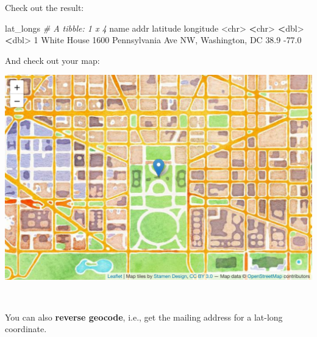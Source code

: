 \documentclass[
]{book}
\newenvironment{Shaded}{\begin{snugshade}}{\end{snugshade}}
\newcommand{\AttributeTok}[1]{\textcolor[rgb]{0.77,0.63,0.00}{#1}}
\newcommand{\CommentTok}[1]{\textcolor[rgb]{0.56,0.35,0.01}{\textit{#1}}}
\newcommand{\DecValTok}[1]{\textcolor[rgb]{0.00,0.00,0.81}{#1}}
\newcommand{\ErrorTok}[1]{\textcolor[rgb]{0.64,0.00,0.00}{\textbf{#1}}}
\newcommand{\FloatTok}[1]{\textcolor[rgb]{0.00,0.00,0.81}{#1}}
\newcommand{\FunctionTok}[1]{\textcolor[rgb]{0.00,0.00,0.00}{#1}}
\newcommand{\NormalTok}[1]{#1}
\newcommand{\SpecialCharTok}[1]{\textcolor[rgb]{0.00,0.00,0.00}{#1}}
\begin{document}
Check out the result:

\begin{Shaded}
\begin{Highlighting}[]
\NormalTok{lat\_longs}
\CommentTok{\# A tibble: 1 x 4}
\NormalTok{  name        addr                                     latitude longitude}
  \SpecialCharTok{\textless{}}\NormalTok{chr}\SpecialCharTok{\textgreater{}}       \ErrorTok{\textless{}}\NormalTok{chr}\SpecialCharTok{\textgreater{}}                                       \ErrorTok{\textless{}}\NormalTok{dbl}\SpecialCharTok{\textgreater{}}     \ErrorTok{\textless{}}\NormalTok{dbl}\SpecialCharTok{\textgreater{}}
\DecValTok{1}\NormalTok{ White House }\DecValTok{1600}\NormalTok{ Pennsylvania Ave NW, Washington, DC     }\FloatTok{38.9}     \SpecialCharTok{{-}}\FloatTok{77.0}
\end{Highlighting}
\end{Shaded}

And check out your map:

\begin{Shaded}
\end{Shaded}

\includegraphics[width=694.08px]{figures/unnamed-chunk-234-1}

~

You can also \textbf{reverse geocode}, i.e., get the mailing address for a lat-long coordinate.
\end{document}
